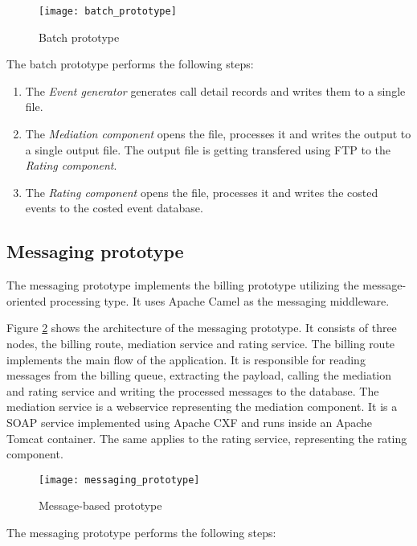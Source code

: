 \begin{figure}[h!]
	\centering
	\texttt{[image: batch\_prototype]}
	\caption{Batch prototype}
	\label{fig:batch_prototype}
\end{figure}

The batch prototype performs the following steps:
\begin{enumerate}
	\item The \emph{Event generator} generates call detail records and writes them to a single file.
	\item The \emph{Mediation component} opens the file, processes it and writes the output to a single output file. The output file is getting transfered using FTP to the \emph{Rating component}.
	\item The \emph{Rating component} opens the file, processes it and writes the costed events to the costed event database.
\end{enumerate}

\subsection{Messaging prototype}

The messaging prototype implements the billing prototype utilizing the message-oriented processing type. It uses Apache Camel\cite{apachecamel} as the messaging middleware.

Figure \ref{fig:message_prototype} shows the architecture of the messaging prototype. It consists of three nodes, the billing route, mediation service and rating service. The billing route implements the main flow of the application. It is responsible for reading messages from the billing queue, extracting the payload, calling the mediation and rating service and writing the processed messages to the database. The mediation service is a webservice representing the mediation component. It is a SOAP service implemented using Apache CXF and runs inside an Apache Tomcat container. The same applies to the rating service, representing the rating component.

\begin{figure}[h!]
	\centering
	\texttt{[image: messaging\_prototype]}
	\caption{Message-based prototype}
	\label{fig:message_prototype}
\end{figure}

The messaging prototype performs the following steps:

